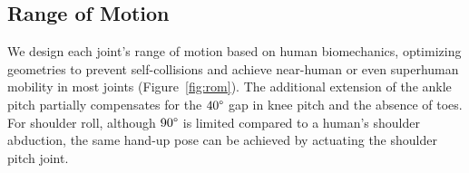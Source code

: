 \subsection{Range of Motion}
\label{sec:range_of_motion}



We design each joint’s range of motion based on human biomechanics, optimizing geometries to prevent self-collisions and achieve near-human or even superhuman mobility in most joints (Figure~\ref{fig:rom}).
The additional extension of the ankle pitch partially compensates for the $40\degree$ gap in knee pitch and the absence of toes. For shoulder roll, although $90\degree$ is limited compared to a human's shoulder abduction, the same hand-up pose can be achieved by actuating the shoulder pitch joint.